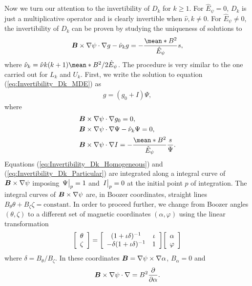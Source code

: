 Now we turn our attention to the invertibility of $D_k$ for $k\ge 1$. For $\hat{E}_\psi =0$, $D_k$ is just a multiplicative operator and is clearly invertible when $\hat{\nu}, k\ne0$. For $\hat{E}_\psi \ne 0$, the invertibility of $D_k$ can be proven by studying the uniqueness of solutions to
\begin{align} 
	\vb*{B}\times\nabla\psi\cdot \nabla g - \hat{\nu}_k g  = - \frac{\mean*{B^2}}{\hat{E}_\psi} s,
	\label{eq:Invertibility_Dk_MDE}
\end{align}
where $\hat{\nu}_k = \hat{\nu} k (k+1) {\mean*{B^2}}/{2\hat{E}_\psi}$. The procedure is very similar to the one carried out for $L_k$ and $U_k$. First, we write the solution to equation (\ref{eq:Invertibility_Dk_MDE}) as
%
\begin{align}
	g = ( g_0 + I ) \Psi,
	\label{eq:Invertibility_Dk_Variation_of_Constants}
\end{align}
where
%
\begin{align}
	& \vb*{B}\times\nabla\psi\cdot \nabla g_0 = 0,  \label{eq:Invertibility_Dk_constant}
	\\
	& \vb*{B}\times\nabla\psi\cdot \nabla \Psi - \hat{\nu}_k \Psi = 0,  \label{eq:Invertibility_Dk_Homogeneous}
	\\
	& \vb*{B}\times\nabla\psi\cdot \nabla I = - \frac{\mean*{B^2}}{\hat{E}_\psi}\frac{s}{\Psi}.  \label{eq:Invertibility_Dk_Particular}
\end{align}
Equations (\ref{eq:Invertibility_Dk_Homogeneous}) and (\ref{eq:Invertibility_Dk_Particular}) are integrated along a integral curve of $\vb*{B}\times\nabla\psi$ imposing $\eval{\Psi}_{p}=1$ and $\eval{I}_{p}=0$ at the initial point $p$ of integration. The integral curves of $\vb*{B}\times\nabla\psi$ are, in Boozer coordinates, straight lines $B_\theta \theta + B_\zeta \zeta = \text{constant}$. In order to proceed further, we change from Boozer angles $(\theta,\zeta)$ to a different set of magnetic coordinates $(\alpha,\varphi)$ using the linear transformation
%
\begin{align}
	\Matrix{c}{\theta \\ \zeta}
	=
	\Matrix{cc}
	{
		(1 + \iota \delta)^{-1}	 &  \iota\\ 
		-\delta(1 + \iota \delta)^{-1}	 &  1
	}
	\Matrix{c}{\alpha \\ \varphi}
	\label{eq:Invertibility_Magnetic_Coordinates_Dk}
\end{align}
where $\delta = B_\theta/B_\zeta$. In these coordinates $\vb*{B} =\nabla \psi \times \nabla \alpha $, $B_\alpha = 0$ and
%
\begin{align}
	\vb*{B}\times\nabla \psi \cdot \nabla = 
	B^2 \pdv{}{\alpha}.
	\label{eq:Invertibility_Dk_Localization_alpha}
\end{align}
